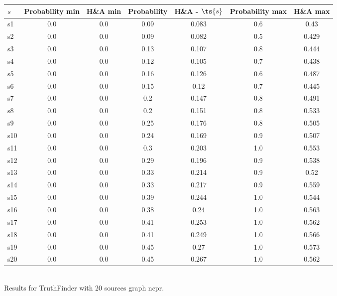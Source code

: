 \documentclass{article}
\begin{document}
\noindent\begin{tabular}{|l|c|c|c|c|c|c|}
\hline
$s$& Probability min & H\&A min & Probability & H\&A - $\ts{s}$ & Probability max & H\&A max\\
\hline
s1 &0.0 & 0.0 & 0.09 & 0.083 & 0.6 & 0.43\\
\hline
s2 &0.0 & 0.0 & 0.09 & 0.082 & 0.5 & 0.429\\
\hline
s3 &0.0 & 0.0 & 0.13 & 0.107 & 0.8 & 0.444\\
\hline
s4 &0.0 & 0.0 & 0.12 & 0.105 & 0.7 & 0.438\\
\hline
s5 &0.0 & 0.0 & 0.16 & 0.126 & 0.6 & 0.487\\
\hline
s6 &0.0 & 0.0 & 0.15 & 0.12 & 0.7 & 0.445\\
\hline
s7 &0.0 & 0.0 & 0.2 & 0.147 & 0.8 & 0.491\\
\hline
s8 &0.0 & 0.0 & 0.2 & 0.151 & 0.8 & 0.533\\
\hline
s9 &0.0 & 0.0 & 0.25 & 0.176 & 0.8 & 0.505\\
\hline
s10 &0.0 & 0.0 & 0.24 & 0.169 & 0.9 & 0.507\\
\hline
s11 &0.0 & 0.0 & 0.3 & 0.203 & 1.0 & 0.553\\
\hline
s12 &0.0 & 0.0 & 0.29 & 0.196 & 0.9 & 0.538\\
\hline
s13 &0.0 & 0.0 & 0.33 & 0.214 & 0.9 & 0.52\\
\hline
s14 &0.0 & 0.0 & 0.33 & 0.217 & 0.9 & 0.559\\
\hline
s15 &0.0 & 0.0 & 0.39 & 0.244 & 1.0 & 0.544\\
\hline
s16 &0.0 & 0.0 & 0.38 & 0.24 & 1.0 & 0.563\\
\hline
s17 &0.0 & 0.0 & 0.41 & 0.253 & 1.0 & 0.562\\
\hline
s18 &0.0 & 0.0 & 0.41 & 0.249 & 1.0 & 0.566\\
\hline
s19 &0.0 & 0.0 & 0.45 & 0.27 & 1.0 & 0.573\\
\hline
s20 &0.0 & 0.0 & 0.45 & 0.267 & 1.0 & 0.562\\
\hline
\end{tabular}\\

\noindent Results for TruthFinder with 20 sources graph ncpr.
\end{document}
